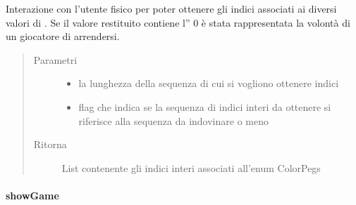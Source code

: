 \documentclass[letterpaper,10pt,italian,openany,oneside]{sphinxmanual}
\begin{document}
\begin{fulllineitems}
\label{\detokenize{source/it/unicam/cs/pa/mastermind/ui/GameView:it.unicam.cs.pa.mastermind.ui.GameView.getIndexSequence(int, boolean)}}
Interazione con l’utente fisico per poter ottenere gli indici associati ai diversi valori di . Se il valore restituito contiene l” 0 è stata rappresentata la volontà di un giocatore  di arrendersi.
\begin{quote}\begin{description}
\item[{Parametri}] \leavevmode\begin{itemize}
\item {} 
 \textendash{} la lunghezza della sequenza di cui si vogliono ottenere indici

\item {} 
 \textendash{} flag che indica se la sequenza di indici interi da ottenere si riferisce alla sequenza da indovinare o meno

\end{itemize}

\item[{Ritorna}] \leavevmode
List contenente gli indici interi associati all’enum ColorPegs

\end{description}\end{quote}

\end{fulllineitems}



\paragraph{showGame}
\label{\detokenize{source/it/unicam/cs/pa/mastermind/ui/GameView:showgame}}
\end{document}
